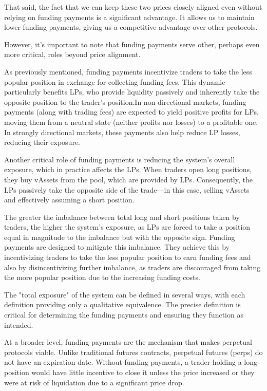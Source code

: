 \documentclass{article}
\begin{document}
That said, the fact that we can keep these two prices closely aligned even without relying on funding payments is a significant advantage. It allows us to maintain lower funding payments, giving us a competitive advantage over other protocols.

However, it’s important to note that funding payments serve other, perhaps even more critical, roles beyond price alignment. 

As previously mentioned, funding payments incentivize traders to take the less popular position in exchange for collecting funding fees. This dynamic particularly benefits LPs, who provide liquidity passively and inherently take the opposite position to the trader’s position.In non-directional markets, funding payments (along with trading fees) are expected to yield positive profits for LPs, moving them from a neutral state (neither profits nor losses) to a profitable one. In strongly directional markets, these payments also help reduce LP losses, reducing their exposure.

Another critical role of funding payments is reducing the system’s overall exposure, which in practice affects the LPs. When traders open long positions, they buy vAssets from the pool, which are provided by LPs. Consequently, the LPs passively take the opposite side of the trade—in this case, selling vAssets and effectively assuming a short position.

The greater the imbalance between total long and short positions taken by traders, the higher the system’s exposure, as LPs are forced to take a position equal in magnitude to the imbalance but with the opposite sign. Funding payments are designed to mitigate this imbalance. They achieve this by incentivizing traders to take the less popular position to earn funding fees and also by disincentivizing further imbalance, as traders are discouraged from taking the more popular position due to the increasing funding costs.

The "total exposure" of the system can be defined in several ways, with each definition providing only a qualitative equivalence. The precise definition is critical for determining the funding payments and ensuring they function as intended.

At a broader level, funding payments are the mechanism that makes perpetual protocols viable. Unlike traditional futures contracts, perpetual futures (perps) do not have an expiration date. Without funding payments, a trader holding a long position would have little incentive to close it unless the price increased or they were at risk of liquidation due to a significant price drop.
\end{document}
